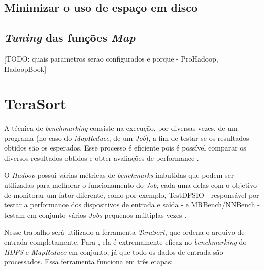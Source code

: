\subsection{Minimizar o uso de espaço em disco}\label{ssec:minimizardisco}
\subsection{\textit{Tuning} das funções \textit{Map}}\label{ssec:tuningmapper}
[TODO: quais parametros serao configurados e porque - ProHadoop, HadoopBook]

\section{TeraSort} \label{sec:terasort}

A técnica de \textit{benchmarking} consiste na execução, por diversas vezes, de um programa (no caso do \textit{MapReduce}, de um \textit{Job}), a fim de testar se os resultados obtidos são os esperados. Esse processo é eficiente pois é possível comparar os diversos resultados obtidos e obter avaliações de performance \cite{HadoopBook15}.

O \textit{Hadoop} possui várias métricas de \textit{benchmarks} imbutidas que podem ser utilizadas para melhorar o funcionamento do \textit{Job}, cada uma delas com o objetivo de monitorar um fator diferente, como por exemplo, TestDFSIO  - responsável por testar a performance dos dispositivos de entrada e saída - e MRBench/NNBench - testam em conjunto vários \textit{Jobs} pequenos múltiplas vezes \cite{HadoopBook15}.

Nesse trabalho será utilizado a ferramenta \textit{TeraSort}, que ordena o arquivo de entrada completamente. Para \textcite{HadoopBook15}, ela é extremamente eficaz no \textit{benchmarking} do \textit{HDFS} e \textit{MapReduce} em conjunto, já que todo os dados de entrada são processados. Essa ferramenta funciona em três etapas:

